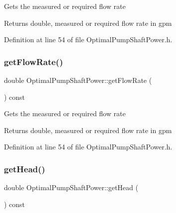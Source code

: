 Gets the measured or required flow rate \begin{DoxyReturn}{Returns}
double, measured or required flow rate in gpm 
\end{DoxyReturn}


Definition at line 54 of file Optimal\+Pump\+Shaft\+Power.\+h.

\mbox{\label{class_optimal_pump_shaft_power_a8c1532459a196347f7d5219d4690a490}} 
\subsubsection{\texorpdfstring{get\+Flow\+Rate()}{getFlowRate()}\hspace{0.1cm}{\footnotesize\ttfamily [3/3]}}
{\footnotesize\ttfamily double Optimal\+Pump\+Shaft\+Power\+::get\+Flow\+Rate (\begin{DoxyParamCaption}{ }\end{DoxyParamCaption}) const\hspace{0.3cm}{\ttfamily [inline]}}

Gets the measured or required flow rate \begin{DoxyReturn}{Returns}
double, measured or required flow rate in gpm 
\end{DoxyReturn}


Definition at line 54 of file Optimal\+Pump\+Shaft\+Power.\+h.

\mbox{\label{class_optimal_pump_shaft_power_abb285a8a256c10187113c34db1a4462b}} 
\subsubsection{\texorpdfstring{get\+Head()}{getHead()}\hspace{0.1cm}{\footnotesize\ttfamily [1/3]}}
{\footnotesize\ttfamily double Optimal\+Pump\+Shaft\+Power\+::get\+Head (\begin{DoxyParamCaption}{ }\end{DoxyParamCaption}) const\hspace{0.3cm}{\ttfamily [inline]}}


